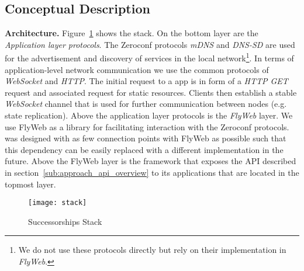 \subsection{Conceptual Description}
\label{sub:approach_conceptual_description}

\textbf{Architecture.} Figure~\ref{fig:stack} shows the \APIName stack. On the bottom layer are the \textit{Application layer protocols}. The Zeroconf protocols \textit{mDNS} and \textit{DNS-SD} are used for the advertisement and discovery of \APIshort services in the local network\footnote{We do not use these protocols directly but rely on their implementation in \textit{FlyWeb}.}. In terms of application-level network communication we use the common protocols of \textit{WebSocket} and \textit{HTTP}. The initial request to a \APIshort app is in form of a \textit{HTTP GET} request and associated request for static resources. Clients then establish a stable \textit{WebSocket} channel that is used for further communication between nodes (e.g. state replication). Above the application layer protocols is the \textit{FlyWeb} layer. We use FlyWeb as a library for facilitating interaction with the Zeroconf protocols. \APIName was designed with as few connection points with FlyWeb as possible such that this dependency can be easily replaced with a different implementation in the future. Above the FlyWeb layer is the \textit{\APIName} framework that exposes the API described in section~\ref{sub:approach_api_overview} to its applications that are located in the topmost layer.

\begin{figure}[h]
    \centering
    \texttt{[image: stack]}
    \caption{Successorships Stack}
    \label{fig:stack}
\end{figure}



